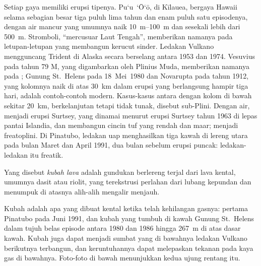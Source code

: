 Setiap gaya memiliki erupsi tipenya. Pu`u~`\=O`\=o, di Kīlauea, bergaya Hawaii selama sebagian besar
tiga puluh lima tahun dan enam puluh satu episodenya, dengan air mancur yang umumnya naik
\qtyrange{10}{100}{m} dan sesekali lebih dari \qty{500}{m}. Stromboli,
``mercusuar Laut Tengah'', memberikan namanya pada letupan-letupan yang membangun
kerucut sinder. Ledakan Vulkano mengguncang Trident di Alaska secara berselang antara
1953 dan 1974. Vesuvius pada tahun 79 M, yang digambarkan oleh Plinius Muda, memberikan namanya pada
; Gunung St.~Helens pada 18~Mei~1980 dan Novarupta pada tahun 1912, yang
kolomnya naik di atas \qty{30}{km} dalam erupsi yang berlangsung hampir tiga hari, adalah
contoh-contoh modern.
Kasus-kasus antara dengan kolom di bawah sekitar \qty{20}{km}, berkelanjutan tetapi tidak tunak,
disebut sub-Plini. Dengan air,  menjadi erupsi Surtsey,
yang dinamai menurut erupsi Surtsey tahun 1963 di lepas pantai Islandia, dan membangun cincin
tuf yang rendah dan maar;  menjadi freatoplini. Di Pinatubo, ledakan
uap menghasilkan tiga kawah di lereng utara pada bulan Maret dan April 1991, dua
bulan sebelum erupsi puncak: ledakan-ledakan itu freatik.

\begin{definition}\label{def:b2:eruptive-styles:dome}
Yang disebut \emph{kubah lava} adalah gundukan berlereng terjal dari lava kental,
umumnya dasit atau riolit, yang terekstrusi perlahan dari lubang kepundan dan menumpuk di atasnya
alih-alih mengalir menjauh.
\end{definition}

Kubah adalah apa yang dibuat  kental ketika telah kehilangan gasnya:  pertama Pinatubo
pada Juni 1991, dan kubah yang tumbuh di kawah Gunung St.~Helens dalam
tujuh belas episode antara 1980 dan 1986 hingga \qty{267}{m} di atas dasar kawah.
Kubah juga dapat menjadi sumbat yang di bawahnya ledakan Vulkano berikutnya terbangun,
dan keruntuhannya dapat melepaskan tekanan pada  kaya gas di bawahnya. Foto-foto
di bawah menunjukkan kedua ujung rentang itu.

